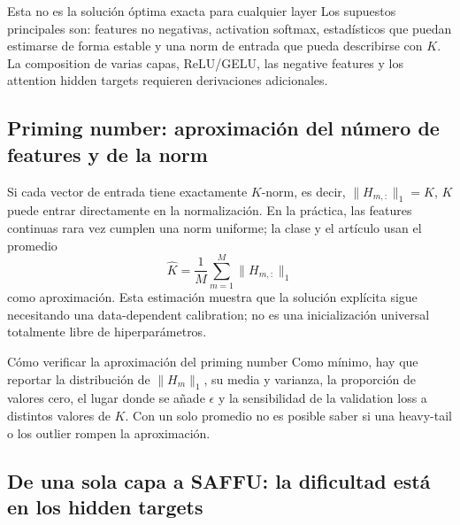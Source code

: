 \begin{warningbox}{Esta no es la solución óptima exacta para cualquier layer}
Los supuestos principales son: features no negativas, activation softmax, estadísticos que puedan estimarse de forma estable y una norm de entrada que pueda describirse con $K$. La composition de varias capas, ReLU/GELU, las negative features y los attention hidden targets requieren derivaciones adicionales.
\end{warningbox}


\subsection{Priming number: aproximación del número de features y de la norm}

Si cada vector de entrada tiene exactamente $K$-norm, es decir, $\|H_{m,:}\|_1=K$, $K$ puede entrar directamente en la normalización. En la práctica, las features continuas rara vez cumplen una norm uniforme; la clase y el artículo usan el promedio
\[
\widehat K=\frac{1}{M}\sum_{m=1}^{M}\|H_{m,:}\|_1
\]
como aproximación. Esta estimación muestra que la solución explícita sigue necesitando una data-dependent calibration; no es una inicialización universal totalmente libre de hiperparámetros.

\begin{knowledgebox}{Cómo verificar la aproximación del priming number}
Como mínimo, hay que reportar la distribución de $\|H_m\|_1$, su media y varianza, la proporción de valores cero, el lugar donde se añade $\epsilon$ y la sensibilidad de la validation loss a distintos valores de $K$. Con un solo promedio no es posible saber si una heavy-tail o los outlier rompen la aproximación.
\end{knowledgebox}


\subsection{De una sola capa a SAFFU: la dificultad está en los hidden targets}

